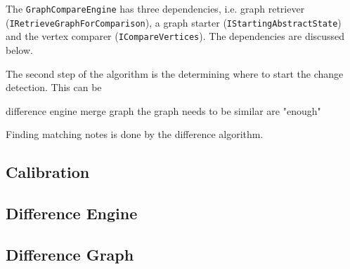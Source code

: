 The \verb|GraphCompareEngine| has three dependencies, i.e. graph retriever (\verb|IRetrieveGraphForComparison|), a graph starter (\verb|IStartingAbstractState|) and the vertex comparer (\verb|ICompareVertices|). The dependencies are discussed below. 




The second step of the algorithm is the determining where to start the change detection. This can be 











difference engine
merge graph \cite{andrews2009visual}
the graph needs to be similar are "enough"

Finding matching notes is done by the difference algorithm. 




\subsection{Calibration}
\subsection{Difference Engine}
\subsection{Difference Graph}
